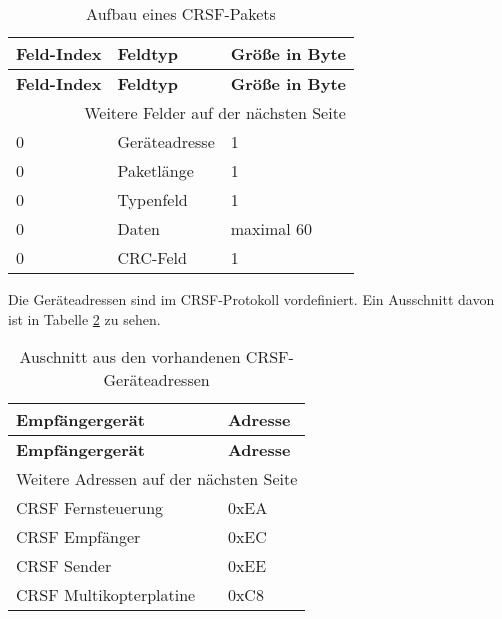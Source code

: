 \begin{longtable}[c]{|l|l|l|}
    \caption{Aufbau eines CRSF-Pakets \cite{cleanflightCrsf}}
    \label{table:crsfPaket}\\
    \hline
    \textbf{Feld-Index} & \textbf{Feldtyp} & \textbf{Größe in Byte}\\
    \hline
    \hline
    \endfirsthead

    \hline
    \textbf{Feld-Index} & \textbf{Feldtyp} & \textbf{Größe in Byte}\\
    \hline
    \hline
    \endhead

    \hline
    \multicolumn{3}{|r|}{Weitere Felder auf der nächsten Seite}\\
    \hline
    \endfoot

    \hline
    \endlastfoot
    
    0 & Geräteadresse & 1\\
    \hline
    0 & Paketlänge & 1\\
    \hline
    0 & Typenfeld & 1\\
    \hline
    0 & Daten & maximal 60\\
    \hline
    0 & CRC-Feld & 1\\
\end{longtable}

Die Geräteadressen sind im CRSF-Protokoll vordefiniert. Ein Ausschnitt davon ist in Tabelle \ref{table:crsfAdressen} zu sehen.

\begin{longtable}[c]{|l|l|}
    \caption{Auschnitt aus den vorhandenen CRSF-Geräteadressen \cite{cleanflightCrsfP}}
    \label{table:crsfAdressen}\\
    \hline
    \textbf{Empfängergerät} & \textbf{Adresse}\\
    \hline
    \hline
    \endfirsthead

    \hline
    \textbf{Empfängergerät} & \textbf{Adresse}\\
    \hline
    \hline
    \endhead

    \hline
    \multicolumn{2}{|r|}{Weitere Adressen auf der nächsten Seite}\\
    \hline
    \endfoot

    \hline
    \endlastfoot
    
    CRSF Fernsteuerung & 0xEA \\
    \hline
    CRSF Empfänger & 0xEC \\
    \hline
    CRSF Sender & 0xEE \\
    \hline
    CRSF Multikopterplatine & 0xC8 \\
\end{longtable}

